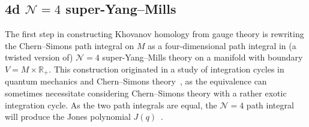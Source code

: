 \documentclass[11pt]{article}
\numberwithin{equation}{section}
\begin{document}
\subsection{4d $\mathcal{N}=4$ super-Yang--Mills}
The first step in constructing Khovanov homology from gauge theory is rewriting the Chern--Simons path integral on $M$ as a four-dimensional path integral in (a twisted version of) $\mathcal{N}=4$ super-Yang--Mills theory on a manifold with boundary $V = M \times \mathbb{R}_+$.
This construction originated in a study of integration cycles in quantum mechanics and Chern--Simons theory~\cite{Witten:2010cx,Witten:2010zr}, as the equivalence can sometimes necessitate considering Chern--Simons theory with a rather exotic integration cycle.
As the two path integrals are equal, the $\mathcal{N}=4$ path integral will produce the Jones polynomial $J(q)$~\cite{Gaiotto:2011nm}.
\end{document}

